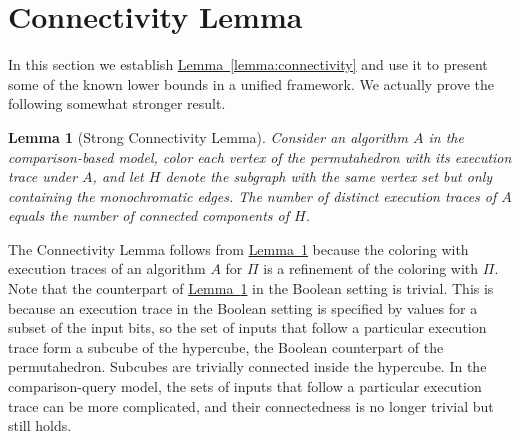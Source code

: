 \documentclass[11pt]{article}
\numberwithin{equation}{section}
\newtheorem{lemma}[theorem]{Lemma}
\theoremstyle{definition}
\theoremstyle{plain}
\newcommand{\expref}[2]{\hyperref[#2]{#1~\ref{#2}}}
\begin{document}
\section{Connectivity Lemma}
\label{sec:connectivity}

In this section we establish \expref{Lemma}{lemma:connectivity} and use it to present some of the known lower bounds in a unified framework. We actually prove the following somewhat stronger result.

\begin{lemma}[Strong Connectivity Lemma]\label{lemma:connectivity:strong}
Consider an algorithm $A$ in the comparison-based model, color each vertex of the permutahedron with its execution trace under $A$, and let $H$ denote the subgraph with the same vertex set but only containing the monochromatic edges. The number of distinct execution traces of $A$ equals the number of connected components of $H$.
\end{lemma}
The Connectivity Lemma follows from \expref{Lemma}{lemma:connectivity:strong} because the coloring with execution traces of an algorithm $A$ for $\Pi$ is a refinement of the coloring with $\Pi$. Note that the counterpart of \expref{Lemma}{lemma:connectivity:strong} in the Boolean setting is trivial. This is because an execution trace in the Boolean setting is specified by values for a subset of the input bits, so the set of inputs that follow a particular execution trace form a subcube of the hypercube, the Boolean counterpart of the permutahedron. Subcubes are trivially connected inside the hypercube. In the comparison-query model, the sets of inputs that follow a particular execution trace can be more complicated, and their connectedness is no longer trivial but still holds.
\end{document}
